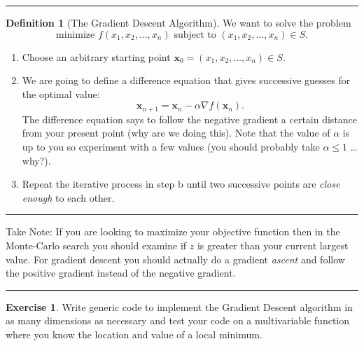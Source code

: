 \documentclass[
]{book}
\theoremstyle{definition}
\newtheorem{definition}{Definition}[chapter]
\theoremstyle{definition}
\theoremstyle{definition}
\newtheorem{exercise}{Exercise}[chapter]
\theoremstyle{remark}
\begin{document}
\begin{center}\rule{0.5\linewidth}{0.5pt}\end{center}

\begin{definition}[The Gradient Descent Algorithm]
\protect\hypertarget{def:unnamed-chunk-208}{}{\label{def:unnamed-chunk-208} {} }We want to solve the problem
\[\text{minimize } f(x_1, x_2, \ldots, x_n) \text{ subject to }(x_1, x_2, \ldots, x_n) \in S.\]

\begin{enumerate}
\def\labelenumi{\alph{enumi}.}
\item
  Choose an arbitrary starting point
  \(\boldsymbol{x}_0 = (x_1,x_2,\ldots,x_n)\in S\).
\item
  We are going to define a difference equation that gives successive
  guesses for the optimal value:
  \[\boldsymbol{x}_{n+1} = \boldsymbol{x}_n - \alpha \nabla f(\boldsymbol{x}_n).\] The difference
  equation says to follow the negative gradient a certain distance
  from your present point (why are we doing this). Note that the value
  of \(\alpha\) is up to you so experiment with a few values (you should
  probably take \(\alpha \le 1\) \ldots why?).
\item
  Repeat the iterative process in step b until two successive points
  are \emph{close enough} to each other.
\end{enumerate}
\end{definition}

\begin{center}\rule{0.5\linewidth}{0.5pt}\end{center}

Take Note: If you are looking to maximize your objective function then in the
Monte-Carlo search you should examine if \(z\) is greater than your
current largest value. For gradient descent you should actually do a
gradient \emph{ascent} and follow the positive gradient instead of the
negative gradient.

\begin{center}\rule{0.5\linewidth}{0.5pt}\end{center}

\begin{exercise}
\protect\hypertarget{exr:unnamed-chunk-209}{}{\label{exr:unnamed-chunk-209} }Write generic code to implement the Gradient Descent algorithm in as
many dimensions as necessary and test your code on a multivariable
function where you know the location and value of a local minimum.
\end{exercise}
\end{document}
